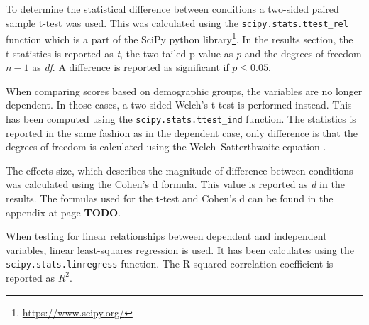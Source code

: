 To determine the statistical difference between conditions a two-sided paired sample t-test was used. This was calculated using the \texttt{scipy.stats.ttest\_rel} function which is a part of the SciPy python library\footnote{\url{https://www.scipy.org/}}. In the results section, the t-statistics is reported as \emph{t}, the two-tailed p-value as \emph{p} and the degrees of freedom $n-1$ as \emph{df}. A difference is reported as significant if $p\le 0.05$.

When comparing scores based on demographic groups, the variables are no longer dependent. In those cases, a two-sided Welch’s t-test is performed instead. This has been computed using the \texttt{scipy.stats.ttest\_ind} function. The statistics is reported in the same fashion as in the dependent case, only difference is that the degrees of freedom is calculated using the Welch–Satterthwaite equation \citep{Allwood2008}.

The effects size, which describes the magnitude of difference between conditions was calculated using the Cohen's d formula. This value is reported as \emph{d} in the results. The formulas used for the t-test and Cohen's d can be found in the appendix at page \textbf{TODO}.

When testing for linear relationships between dependent and independent variables, linear least-squares regression is used. It has been calculates using the \texttt{scipy.stats.linregress} function. The R-squared correlation coefficient is reported as $R^2$.

